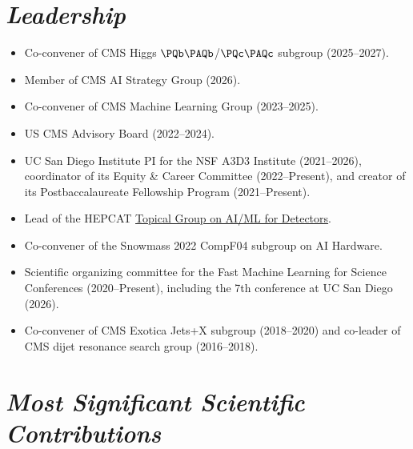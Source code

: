 \documentclass[11pt]{res}
\newcommand{\MarginText}[1]{\section{\textit{#1}}}
\begin{document}
\begin{resume}
  \MarginText{Leadership}
  \begin{itemize}
    \itemsep-0.3em
    \item Co-convener of CMS Higgs $\bbbar$/$\ccbar$ subgroup (2025--2027).
    \item Member of CMS AI Strategy Group (2026).
    \item Co-convener of CMS Machine Learning Group (2023--2025).
    \item US CMS Advisory Board (2022--2024).
    \item UC San Diego Institute PI for the NSF A3D3 Institute (2021--2026), coordinator of its Equity \& Career Committee (2022--Present), and creator of its Postbaccalaureate Fellowship Program (2021--Present).
    \item Lead of the HEPCAT \href{https://hepcat.ucsd.edu/topical-groups/tg7-ai-ml-for-detectors-2/}{Topical Group on AI/ML for Detectors}.
    \item Co-convener of the Snowmass 2022 CompF04 subgroup on AI Hardware.
    \item Scientific organizing committee for the Fast Machine Learning for Science Conferences (2020--Present), including the 7th conference at UC San Diego (2026).
    \item Co-convener of CMS Exotica Jets+X subgroup (2018--2020) and co-leader of CMS dijet resonance search group (2016--2018).
  \end{itemize}

  \MarginText{Most Significant Scientific Contributions}




\end{resume}
\end{document}
